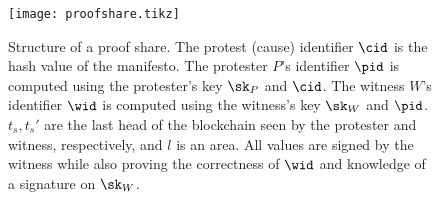 
\begin{figure}
  \centering
  \texttt{[image: proofshare.tikz]}
  \caption{%
    Structure of a proof share.
    The protest (cause) identifier \(\cid\) is the hash value of the manifesto.
    The protester \(P\)'s identifier \(\pid\) is computed using the protester's 
    key \(\sk_P\) and \(\cid\).
    The witness \(W\)'s identifier \(\wid\) is computed using the witness's key 
    \(\sk_W\) and \(\pid\).
    \(t_s, t_s'\) are the last head of the blockchain seen by the protester and 
    witness, respectively, and \(l\) is an area.
    All values are signed by the witness while also proving the correctness of 
    \(\wid\) and knowledge of a signature on \(\sk_W\).
  }%
  \label{fig:ProofFig}
\end{figure}%

